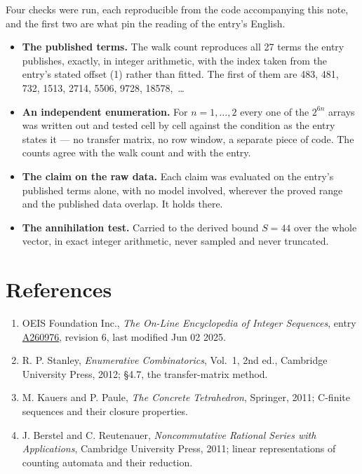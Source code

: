 \documentclass[11pt]{article}
\theoremstyle{definition}
\begin{document}
Four checks were run, each reproducible from the code accompanying this note, and the first two are what pin the reading of the entry's English.

\begin{itemize}

\item {\bfseries The published terms.} The walk count reproduces all 27 terms the entry publishes, exactly, in integer arithmetic, with the index taken from the entry's stated offset (1) rather than fitted. The first of them are 483, 481, 732, 1513, 2714, 5506, 9728, 18578,~\dots

\item {\bfseries An independent enumeration.} For $n = 1,\dots,2$ every one of the $2^{6n}$ arrays was written out and tested cell by cell against the condition as the entry states it --- no transfer matrix, no row window, a separate piece of code. The counts agree with the walk count and with the entry.

\item {\bfseries The claim on the raw data.} Each claim was evaluated on the entry's published terms alone, with no model involved, wherever the proved range and the published data overlap. It holds there.

\item {\bfseries The annihilation test.} Carried to the derived bound $S = 44$ over the whole vector, in exact integer arithmetic, never sampled and never truncated.

\end{itemize}

\section{References}

\begin{enumerate}

\item OEIS Foundation Inc., \emph{The On-Line Encyclopedia of Integer Sequences}, entry \href{https://oeis.org/A260976}{A260976}, revision 6, last modified Jun 02 2025.

\item R. P. Stanley, \emph{Enumerative Combinatorics}, Vol.~1, 2nd ed., Cambridge University Press, 2012; \S4.7, the transfer-matrix method.

\item M. Kauers and P. Paule, \emph{The Concrete Tetrahedron}, Springer, 2011; C-finite sequences and their closure properties.

\item J. Berstel and C. Reutenauer, \emph{Noncommutative Rational Series with Applications}, Cambridge University Press, 2011; linear representations of counting automata and their reduction.

\end{enumerate}
\end{document}
